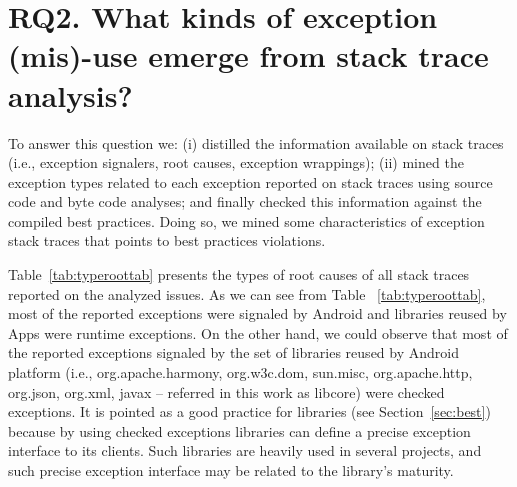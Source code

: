 \documentclass[conference]{IEEEtran}
\begin{document}



\section{RQ2.  What kinds of exception (mis)-use emerge from stack trace analysis? }

To answer this question we: (i) distilled the information available on stack traces (i.e., exception signalers, root causes, exception wrappings); 
(ii) mined the exception types related to each exception reported on stack traces using source code and byte code analyses; and finally checked 
this information against the compiled best practices. Doing so, we mined some characteristics of exception stack traces that points to best practices violations.

 Table~\ref{tab:typeroottab} presents the types of root causes of all stack traces reported on the analyzed issues. As we can see 
from Table ~\ref{tab:typeroottab},  most of the reported exceptions were signaled by Android and libraries reused by Apps were runtime exceptions. 
On the other hand, we could observe that most of the reported exceptions signaled by the set of 
libraries reused by Android platform (i.e., org.apache.harmony,
org.w3c.dom, sun.misc, org.apache.http, org.json, org.xml, javax -- referred in
this work as libcore) were checked exceptions. It is pointed as a good practice
for libraries (see Section~\ref{sec:best}) because by using checked exceptions
libraries can define a precise exception interface to its clients. Such
libraries are heavily used in several projects, and such precise exception
interface may be related to the library's maturity.
\end{document}
